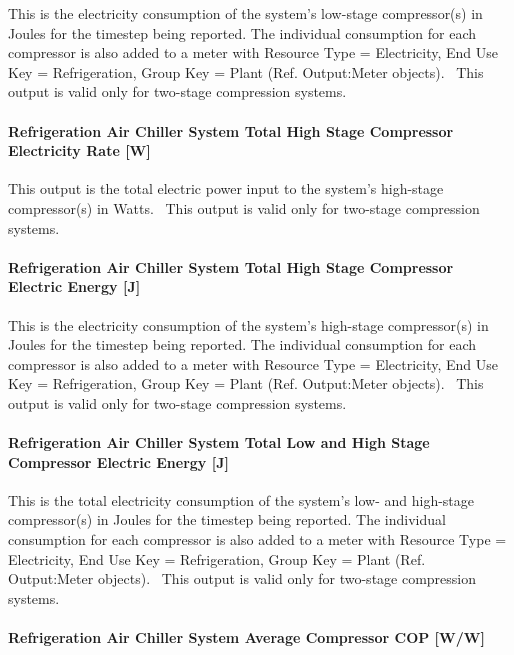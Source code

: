 This is the electricity consumption of the system's low-stage compressor(s) in Joules for the timestep being reported. The individual consumption for each compressor is also added to a meter with Resource Type = Electricity, End Use Key = Refrigeration, Group Key = Plant (Ref. Output:Meter objects).~ This output is valid only for two-stage compression systems.

\paragraph{Refrigeration Air Chiller System Total High Stage Compressor Electricity Rate {[}W{]}}\label{refrigeration-air-chiller-system-total-high-stage-compressor-electric-power-w}

This output is the total electric power input to the system's high-stage compressor(s) in Watts.~ This output is valid only for two-stage compression systems.

\paragraph{Refrigeration Air Chiller System Total High Stage Compressor Electric Energy {[}J{]}}\label{refrigeration-air-chiller-system-total-high-stage-compressor-electric-energy-j}

This is the electricity consumption of the system's high-stage compressor(s) in Joules for the timestep being reported. The individual consumption for each compressor is also added to a meter with Resource Type = Electricity, End Use Key = Refrigeration, Group Key = Plant (Ref. Output:Meter objects).~ This output is valid only for two-stage compression systems.

\paragraph{Refrigeration Air Chiller System Total Low and High Stage Compressor Electric Energy {[}J{]}}\label{refrigeration-air-chiller-system-total-low-and-high-stage-compressor-electric-energy-j}

This is the total electricity consumption of the system's low- and high-stage compressor(s) in Joules for the timestep being reported. The individual consumption for each compressor is also added to a meter with Resource Type = Electricity, End Use Key = Refrigeration, Group Key = Plant (Ref. Output:Meter objects).~ This output is valid only for two-stage compression systems.

\paragraph{Refrigeration Air Chiller System Average Compressor COP {[}W/W{]}}\label{refrigeration-air-chiller-system-average-compressor-cop-ww}

